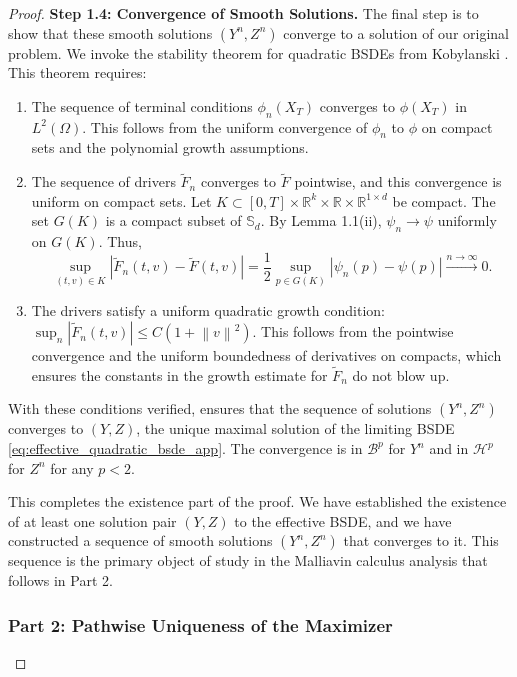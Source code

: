 \documentclass[12pt, letterpaper]{amsart}
\newcommand{\Bcal}{\mathcal{B}}
\newcommand{\Hcal}{\mathcal{H}}
\newcommand{\Sd}{\mathbb{S}_d}
\newcommand{\R}{\mathbb{R}}
\newcommand{\norm}[1]{\left\lVert#1\right\rVert}
\newcommand{\abs}[1]{\left\lvert#1\right\rvert}
\theoremstyle{plain}
\theoremstyle{definition}
\theoremstyle{remark}
\numberwithin{equation}{section} %
\begin{document}
\begin{proof}
\vspace{1ex}
\noindent\textbf{Step 1.4: Convergence of Smooth Solutions.}
The final step is to show that these smooth solutions \((Y^n, Z^n)\) converge to a solution of our original problem. We invoke the stability theorem for quadratic BSDEs from Kobylanski \cite[Theorem 4.2]{Kobylanski2000}. This theorem requires:
\begin{enumerate}
    \item The sequence of terminal conditions \(\phi_n(X_T)\) converges to \(\phi(X_T)\) in $L^2(\Omega)$. This follows from the uniform convergence of $\phi_n$ to $\phi$ on compact sets and the polynomial growth assumptions.
    \item The sequence of drivers \(\tilde{F}_n\) converges to \(\tilde{F}\) pointwise, and this convergence is uniform on compact sets. Let \(K \subset [0,T] \times \R^k \times \R \times \R^{1\times d}\) be compact. The set \(G(K)\) is a compact subset of \(\Sd\). By Lemma 1.1(ii), \(\psi_n \to \psi\) uniformly on \(G(K)\). Thus,
    \[ \sup_{(t,v) \in K} \abs{\tilde{F}_n(t,v) - \tilde{F}(t,v)} = \frac{1}{2} \sup_{p \in G(K)} \abs{\psi_n(p) - \psi(p)} \xrightarrow{n\to\infty} 0. \]
    \item The drivers satisfy a uniform quadratic growth condition: \(\sup_n \abs{\tilde{F}_n(t,v)} \le C(1+\norm{v}^2)\). This follows from the pointwise convergence and the uniform boundedness of derivatives on compacts, which ensures the constants in the growth estimate for $\tilde{F}_n$ do not blow up.
\end{enumerate}
With these conditions verified, \cite[Theorem 4.2]{Kobylanski2000} ensures that the sequence of solutions \((Y^n, Z^n)\) converges to \((Y,Z)\), the unique maximal solution of the limiting BSDE \eqref{eq:effective_quadratic_bsde_app}. The convergence is in \(\Bcal^p\) for \(Y^n\) and in \(\Hcal^p\) for \(Z^n\) for any \(p < 2\).

This completes the existence part of the proof. We have established the existence of at least one solution pair \((Y,Z)\) to the effective BSDE, and we have constructed a sequence of smooth solutions \((Y^n,Z^n)\) that converges to it. This sequence is the primary object of study in the Malliavin calculus analysis that follows in Part 2.


\subsubsection*{\textbf{Part 2: Pathwise Uniqueness of the Maximizer}}
\label{proof:part2_pathwise_uniqueness_maximizer}


\end{proof}
\end{document}
